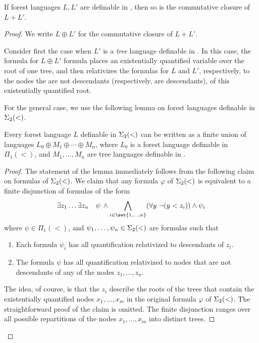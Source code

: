\documentclass{LMCS}
\begin{document}
\begin{lem}\label{oplus-forests}
  If forest languages $L,L'$ are definable in \Stwo,  then so is the
  commutative closure of $L+L'$.
\end{lem}
\begin{proof}
We write $L \oplus L'$ for the commutative closure of $L + L'$.


Consider first the case when $L'$ is a \emph{tree} language definable in
\Stwo. In this case, the formula for $L \oplus L'$ formula places an
existentially quantified variable over the root of one tree, and then
relativizes the formulas for $L$ and $L'$, respectively, to the nodes
the are not descendants (respectively, are descendants), of this
existentially quantified root.

For the general case, we use the following lemma on forest languages definable in $\Sigma_2(<)$.
\begin{lem}\label{lem:experimental}
	Every forest language $L$ definable in $\Sigma_2(<)$ can be written
	as a finite union of languages $L_0 \oplus M_1 \oplus \cdots \oplus M_n$, where
	$L_0$ is a forest language definable in $\Pi_1(<)$, and  $M_1,\ldots,M_n$ are tree
	languages definable in \Stwo.
\end{lem}
\begin{proof}
	The statement of the lemma immediately follows from the following claim on formulas of $\Sigma_2(<)$. We claim that any formula  $\varphi$  of $\Sigma_2(<)$ is equivalent to a finite disjunction of formulas of the form
	\[
          \exists z_1 \ldots \exists z_n \quad \psi\, \land \bigwedge_{i \in
            \set{1,\ldots,n}} (\forall y \ \neg (y < z_i)) \land \psi_i
	\]
	where  $\psi \in \Pi_1(<)$,  and $\psi_1,\ldots,\psi_n \in \Sigma_2(<)$ are formulas such that
	\begin{enumerate}[$\bullet$]
		\item Each formula $\psi_i$ has all  quantification  relativized to descendants of $z_i$.
		\item The formula $\psi$ has all quantification relativized to nodes that are not descendants of any of the nodes $z_1,\ldots,z_n$.
	\end{enumerate}
	The idea, of course, is that the $z_i$ describe the roots of the trees
        that contain the existentially quantified nodes $x_1,\ldots,x_m$ in the
        original formula $\varphi$ of $\Sigma_2(<)$. The straightforward proof of the
        claim is omitted. The finite disjunction ranges over all possible
        repartitions of the nodes $x_1,\ldots,x_m$ into distinct trees.
\end{proof}




\end{proof}
\end{document}
